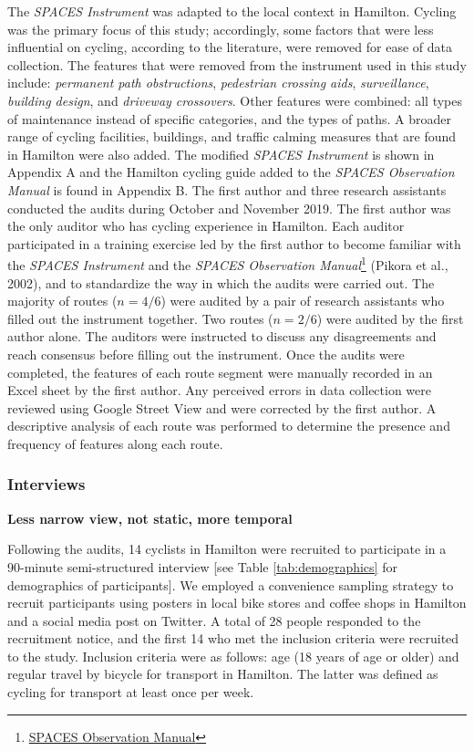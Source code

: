 \documentclass[]{elsarticle} %
\begin{document}
The \emph{SPACES Instrument} was adapted to the local context in
Hamilton. Cycling was the primary focus of this study; accordingly, some
factors that were less influential on cycling, according to the
literature, were removed for ease of data collection. The features that
were removed from the instrument used in this study include:
\emph{permanent path obstructions}, \emph{pedestrian crossing aids},
\emph{surveillance}, \emph{building design}, and \emph{driveway
crossovers}. Other features were combined: all types of maintenance
instead of specific categories, and the types of paths. A broader range
of cycling facilities, buildings, and traffic calming measures that are
found in Hamilton were also added. The modified \emph{SPACES Instrument}
is shown in Appendix A and the Hamilton cycling guide added to the
\emph{SPACES Observation Manual} is found in Appendix B. The first
author and three research assistants conducted the audits during October
and November 2019. The first author was the only auditor who has cycling
experience in Hamilton. Each auditor participated in a training exercise
led by the first author to become familiar with the \emph{SPACES
Instrument} and the \emph{SPACES Observation Manual}\footnote{\href{https://activelivingresearch.org/sites/activelivingresearch.org/files/SPACES_Observation_Manual.pdf}{SPACES
  Observation Manual}} (Pikora et al., 2002), and to standardize the way
in which the audits were carried out. The majority of routes
(\(n = 4/6\)) were audited by a pair of research assistants who filled
out the instrument together. Two routes (\(n = 2/6\)) were audited by
the first author alone. The auditors were instructed to discuss any
disagreements and reach consensus before filling out the instrument.
Once the audits were completed, the features of each route segment were
manually recorded in an Excel sheet by the first author. Any perceived
errors in data collection were reviewed using Google Street View and
were corrected by the first author. A descriptive analysis of each route
was performed to determine the presence and frequency of features along
each route.

\hypertarget{interviews}{%
\subsubsection{Interviews}\label{interviews}}

\textbf{Less narrow view, not static, more temporal}

Following the audits, 14 cyclists in Hamilton were recruited to
participate in a 90-minute semi-structured interview {[}see Table
\ref{tab:demographics} for demographics of participants{]}. We employed
a convenience sampling strategy to recruit participants using posters in
local bike stores and coffee shops in Hamilton and a social media post
on Twitter. A total of 28 people responded to the recruitment notice,
and the first 14 who met the inclusion criteria were recruited to the
study. Inclusion criteria were as follows: age (18 years of age or
older) and regular travel by bicycle for transport in Hamilton. The
latter was defined as cycling for transport at least once per week.
\end{document}
